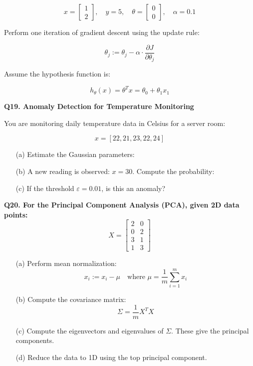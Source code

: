 \documentclass{article}
\begin{document}
\[
x = 
\begin{bmatrix}
1 \\
2
\end{bmatrix}, \quad
y = 5, \quad
\theta = 
\begin{bmatrix}
0 \\
0
\end{bmatrix}, \quad
\alpha = 0.1
\]

Perform one iteration of gradient descent using the update rule:

\[
\theta_j := \theta_j - \alpha \cdot \frac{\partial J}{\partial \theta_j}
\]

Assume the hypothesis function is:

\[
h_\theta(x) = \theta^T x = \theta_0 + \theta_1 x_1
\]

\vspace{1\baselineskip}
\textbf{Q19. Anomaly Detection for Temperature Monitoring}

You are monitoring daily temperature data in Celsius for a server room:

\[
x = [22, 21, 23, 22, 24]
\]

\begin{itemize}
    \item[(a)] Estimate the Gaussian parameters:
  
    \item[(b)] A new reading is observed: \( x = 30 \). Compute the probability:


    \item[(c)] If the threshold \( \varepsilon = 0.01 \), is this an anomaly?
\end{itemize}


\vspace{1\baselineskip}

\textbf{Q20. For the Principal Component Analysis (PCA), given 2D data points:}
\[
X = 
\begin{bmatrix}
2 & 0 \\
0 & 2 \\
3 & 1 \\
1 & 3
\end{bmatrix}
\]

\begin{itemize}
    \item[(a)] Perform mean normalization:
    \[
    x_i := x_i - \mu \quad \text{where } \mu = \frac{1}{m} \sum_{i=1}^m x_i
    \]

    \item[(b)] Compute the covariance matrix:
    \[
    \Sigma = \frac{1}{m} X^T X
    \]

    \item[(c)] Compute the eigenvectors and eigenvalues of \( \Sigma \). These give the principal components.

    \item[(d)] Reduce the data to 1D using the top principal component.
\end{itemize}
\end{document}
